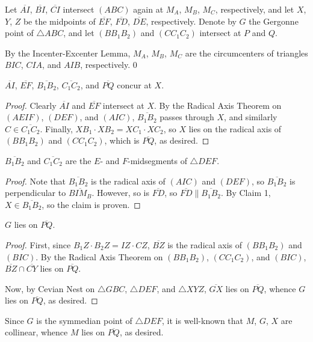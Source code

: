 Let $\overline{AI}$, $\overline{BI}$, $\overline{CI}$ intersect $(ABC)$ again at $M_A$, $M_B$, $M_C$, respectively, and let $X$, $Y$, $Z$ be the midpoints of $\overline{EF}$, $\overline{FD}$, $\overline{DE}$, respectively. Denote by $G$ the Gergonne point of $\triangle ABC$, and let $(BB_1B_2)$ and $(CC_1C_2)$ intersect at $P$ and $Q$.

By the Incenter-Excenter Lemma, $M_A$, $M_B$, $M_C$ are the circumcenters of triangles $BIC$, $CIA$, and $AIB$, respectively.
\setcounter{claim}0
\begin{claim}
    $\overline{AI}$, $\overline{EF}$, $\overline{B_1B_2}$, $\overline{C_1C_2}$, and $\overline{PQ}$ concur at $X$.
\end{claim}
\begin{proof}
    Clearly $\overline{AI}$ and $\overline{EF}$ intersect at $X$. By the Radical Axis Theorem on $(AEIF)$, $(DEF)$, and $(AIC)$, $\overline{B_1B_2}$ passes through $X$, and similarly $C\in\overline{C_1C_2}$. Finally, $XB_1\cdot XB_2=XC_1\cdot XC_2$, so $X$ lies on the radical axis of $(BB_1B_2)$ and $(CC_1C_2)$, which is $\overline{PQ}$, as desired.
\end{proof}
\begin{claim}
    $\overline{B_1B_2}$ and $\overline{C_1C_2}$ are the $E$- and $F$-midsegments of $\triangle DEF$.
\end{claim}
\begin{proof}
    Note that $\overline{B_1B_2}$ is the radical axis of $(AIC)$ and $(DEF)$, so $\overline{B_1B_2}$ is perpendicular to $\overline{BIM_B}$. However, so is $\overline{FD}$, so $\overline{FD}\parallel\overline{B_1B_2}$. By Claim 1, $X\in\overline{B_1B_2}$, so the claim is proven.
\end{proof}
\begin{claim}
    $G$ lies on $\overline{PQ}$.
\end{claim}
\begin{proof}
    First, since $B_1Z\cdot B_2Z=IZ\cdot CZ$, $\overline{BZ}$ is the radical axis of $(BB_1B_2)$ and $(BIC)$. By the Radical Axis Theorem on $(BB_1B_2)$, $(CC_1C_2)$, and $(BIC)$, $\overline{BZ}\cap\overline{CY}$ lies on $\overline{PQ}$.

    Now, by Cevian Nest on $\triangle GBC$, $\triangle DEF$, and $\triangle XYZ$, $\overline{GX}$ lies on $\overline{PQ}$, whence $G$ lies on $\overline{PQ}$, as desired.
\end{proof}

Since $G$ is the symmedian point of $\triangle DEF$, it is well-known that $M$, $G$, $X$ are collinear, whence $M$ lies on $\overline{PQ}$, as desired.
